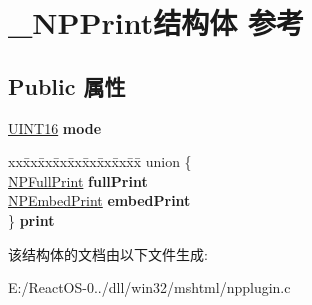 \hypertarget{struct___n_p_print}{}\section{\+\_\+\+N\+P\+Print结构体 参考}
\label{struct___n_p_print}
\subsection*{Public 属性}
\begin{DoxyCompactItemize}
\item 
\mbox{\label{struct___n_p_print_a1b9ae7192c32e2d52e67b1c3bb57b079}} 
\hyperlink{_processor_bind_8h_a09f1a1fb2293e33483cc8d44aefb1eb1}{U\+I\+N\+T16} {\bfseries mode}
\item 
\mbox{\label{struct___n_p_print_ad82ebd9ce696a07ccc60f9550ec8b247}} 
\begin{tabbing}
xx\=xx\=xx\=xx\=xx\=xx\=xx\=xx\=xx\=\kill
union \{\\
\>\hyperlink{struct___n_p_full_print}{NPFullPrint} {\bfseries fullPrint}\\
\>\hyperlink{struct___n_p_embed_print}{NPEmbedPrint} {\bfseries embedPrint}\\
\} {\bfseries print}\\

\end{tabbing}\end{DoxyCompactItemize}


该结构体的文档由以下文件生成\+:\begin{DoxyCompactItemize}
\item 
E\+:/\+React\+O\+S-\/0../dll/win32/mshtml/npplugin.\+c\end{DoxyCompactItemize}
